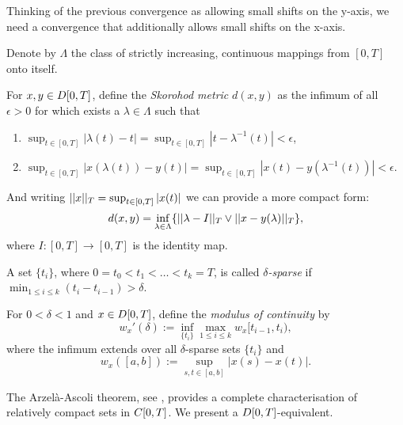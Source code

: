 Thinking of the previous convergence as allowing small shifts on the y-axis,
we need a convergence that additionally allows small shifts on the x-axis.

\begin{definition} \label{D: skorohod}
	Denote by $\Lambda$ the class of strictly increasing, continuous mappings from $[0,T]$ onto itself.
	
	For $x, y \in D[0, T]$, define the \emph{Skorohod metric} $d(x,y)$ as the infimum of all $\epsilon > 0$ 
	for which exists a $\lambda \in \Lambda$ such that
	\begin{enumerate}
		\item $\sup_{t \in [0,T]}|\lambda (t) - t| = \sup_{t \in [0,T]}|t - \lambda^{-1}(t)| < \epsilon$,
		\item  $\sup_{t \in [0,T]}|x(\lambda (t)) - y(t)| = \sup_{t \in [0,T]}|x(t) - y(\lambda^{-1}(t))| < \epsilon$.
	\end{enumerate}
	And writing $||x||_T = \sup_{t \in [0,T]}|x(t)|$ we can provide a more compact form: \label{I: supnorm}
	\begin{equation}
		d(x,y) = \inf_{\lambda \in \Lambda}\{ ||\lambda - I||_T \vee ||x - y(\lambda)||_T \},
	\end{equation}
	where $I:[0,T] \rightarrow [0,T]$ is the identity map.
\end{definition}

\begin{definition} \label{D: modulus of continuity}
	A set $\{t_i\}$, where $ 0 = t_0 < t_1 < \dots < t_k = T $,
	is called \emph{$\delta$-sparse} if $\min_{1\leq i \leq k} (t_i - t_{i-1}) > \delta$.
	
	For $0 < \delta < 1$ and $x \in D[0, T]$, define the \emph{modulus of continuity} by
	\begin{equation*}
		w_x'(\delta) := \inf_{\{t_i\}} \max_{1\leq i \leq k} w_x[t_{i-1}, t_i),
	\end{equation*}
	where the infimum extends over all $\delta$-sparse sets $\{t_i\}$ and
	\begin{equation*}
		w_x([a,b]) := \sup_{s,t \in [a,b]}|x(s)  -x(t)|.
	\end{equation*}
\end{definition}

The Arzelà-Ascoli theorem, see \cite[Theorem 7.2, p.82]{Billingsley.1999},
provides a complete characterisation of relatively compact sets in $C[0, T]$.
We present a $D[0, T]$-equivalent.

